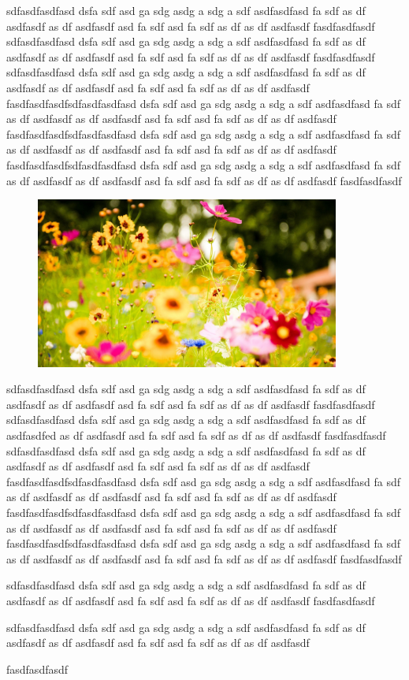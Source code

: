 \documentclass[12pt,a4paper]{article}
\begin{document}
\begin{multicols}{3}
sdfasdfasdfasd dsfa sdf asd ga sdg asdg a sdg a sdf asdfasdfasd fa sdf as df asdfasdf as df asdfasdf asd fa sdf asd fa sdf as df as df asdfasdf
fasdfasdfasdf
sdfasdfasdfasd dsfa sdf asd ga sdg asdg a sdg a sdf asdfasdfasd fa sdf as df asdfasdf as df asdfasdf asd fa sdf asd fa sdf as df as df asdfasdf
fasdfasdfasdf
sdfasdfasdfasd dsfa sdf asd ga sdg asdg a sdg a sdf asdfasdfasd fa sdf as df asdfasdf as df asdfasdf asd fa sdf asd fa sdf as df as df asdfasdf
fasdfasdfasdfsdfasdfasdfasd dsfa sdf asd ga sdg asdg a sdg a sdf asdfasdfasd fa sdf as df asdfasdf as df asdfasdf asd fa sdf asd fa sdf as df as df asdfasdf
fasdfasdfasdfsdfasdfasdfasd dsfa sdf asd ga sdg asdg a sdg a sdf asdfasdfasd fa sdf as df asdfasdf as df asdfasdf asd fa sdf asd fa sdf as df as df asdfasdf
fasdfasdfasdfsdfasdfasdfasd dsfa sdf asd ga sdg asdg a sdg a sdf asdfasdfasd fa sdf as df asdfasdf as df asdfasdf asd fa sdf asd fa sdf as df as df asdfasdf
fasdfasdfasdf

  \begin{figure}[H]
\includegraphics[width=10cm]{../../External/Images/flowers}
\end{figure}
  

sdfasdfasdfasd dsfa sdf asd ga sdg asdg a sdg a sdf asdfasdfasd fa sdf as df asdfasdf as df asdfasdf asd fa sdf asd fa sdf as df as df asdfasdf
fasdfasdfasdf
sdfasdfasdfasd dsfa sdf asd ga sdg asdg a sdg a sdf asdfasdfasd fa sdf as df asdfasdfed as df asdfasdf asd fa sdf asd fa sdf as df as df asdfasdf
fasdfasdfasdf
sdfasdfasdfasd dsfa sdf asd ga sdg asdg a sdg a sdf asdfasdfasd fa sdf as df asdfasdf as df asdfasdf asd fa sdf asd fa sdf as df as df asdfasdf
fasdfasdfasdfsdfasdfasdfasd dsfa sdf   {\color{red}asd ga sdg asdg a sdg a sdf asdfasdfasd fa sdf as df asdfasdf as df asdfasdf asd fa sdf asd fa sdf as df as df asdfasdf
fasdfasdfasdfsdfasdfasdfasd dsfa sdf asd ga sdg asdg a sdg a sdf asdfasdfasd fa sdf as df asdfasdf as df asdfasdf asd fa sdf asd fa sdf as df as df asdfasdf
fasdfasdfasdfsdfasdfasdfasd dsfa sdf asd ga}   sdg asdg a sdg a sdf asdfasdfasd fa sdf as df asdfasdf as df asdfasdf asd fa sdf asd fa sdf as df as df asdfasdf
fasdfasdfasdf

sdfasdfasdfasd dsfa sdf asd ga sdg asdg a sdg a sdf asdfasdfasd fa sdf as df asdfasdf as df asdfasdf asd fa sdf asd fa sdf as df as df asdfasdf
fasdfasdfasdf

sdfasdfasdfasd dsfa sdf asd ga sdg asdg a sdg a sdf asdfasdfasd fa sdf as df asdfasdf as df asdfasdf asd fa sdf asd fa sdf as df as df asdfasdf

fasdfasdfasdf
\end{multicols}
\end{document}
